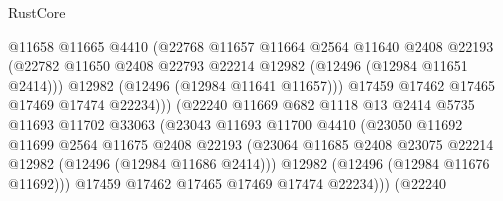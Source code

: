 \begin{lexlean}{RustCore}
\begin{coremodule}
                                  @11658
                                  @11665
                                  @4410
                                  (@22768
                                    @11657
                                    @11664
                                    @2564
                                    @11640
                                    @2408
                                    @22193
                                    (@22782
                                      @11650
                                      @2408
                                      @22793
                                      @22214
                                      @12982
                                      (@12496 (@12984 @11651 @2414)))
                                    @12982
                                    (@12496 (@12984 @11641 @11657)))
                                  @17459
                                  @17462
                                  @17465
                                  @17469
                                  @17474
                                  @22234)))
                            (@22240
                              @11669
                              @682
                              @1118
                              @13
                              @2414
                              @5735
                              @11693
                              @11702
                              @33063
                              (@23043
                                @11693
                                @11700
                                @4410
                                (@23050
                                  @11692
                                  @11699
                                  @2564
                                  @11675
                                  @2408
                                  @22193
                                  (@23064
                                    @11685
                                    @2408
                                    @23075
                                    @22214
                                    @12982
                                    (@12496 (@12984 @11686 @2414)))
                                  @12982
                                  (@12496 (@12984 @11676 @11692)))
                                @17459
                                @17462
                                @17465
                                @17469
                                @17474
                                @22234)))
                          (@22240

\end{coremodule}
\end{lexlean}

